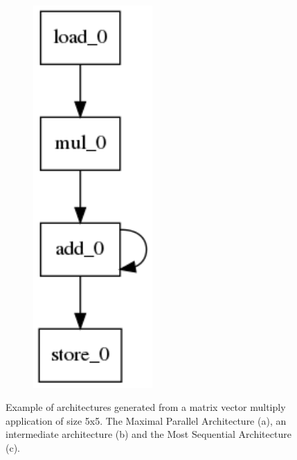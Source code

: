 \begin{figure}[ht]
\begin{subfigure}{.3\columnwidth}
  \caption{}
  \label{fig:inter_arch}
\end{subfigure}
\begin{subfigure}{.2\columnwidth}
  \centering
  \includegraphics[width=0.5\textwidth]{images/Architecture_latency_188_schematic.png}
  \caption{}
  \label{fig:most_seq_arch}
\end{subfigure}
    \caption{Example of architectures generated from a matrix vector multiply application of size 5x5. The Maximal Parallel Architecture (a), an intermediate architecture (b) and the Most Sequential Architecture (c).}
\label{fig:tradeoffs}
\end{figure}

